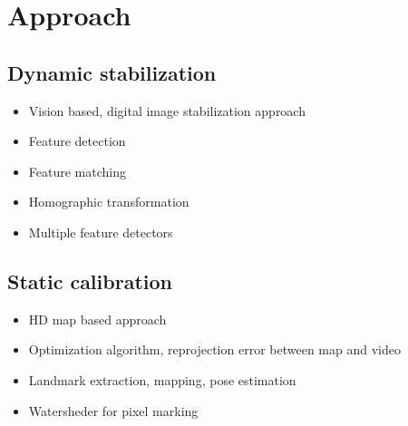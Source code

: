 \section{Approach}

\subsection{Dynamic stabilization}
\begin{itemize}
  \item Vision based, digital image stabilization approach
  \item Feature detection
  \item Feature matching
  \item Homographic transformation
  \item Multiple feature detectors  
\end{itemize}
\subsection{Static calibration}
\begin{itemize}
  \item HD map based approach
  \item Optimization algorithm, reprojection error between map and video 
  \item Landmark extraction, mapping, pose estimation
  \item Watersheder for pixel marking
\end{itemize}